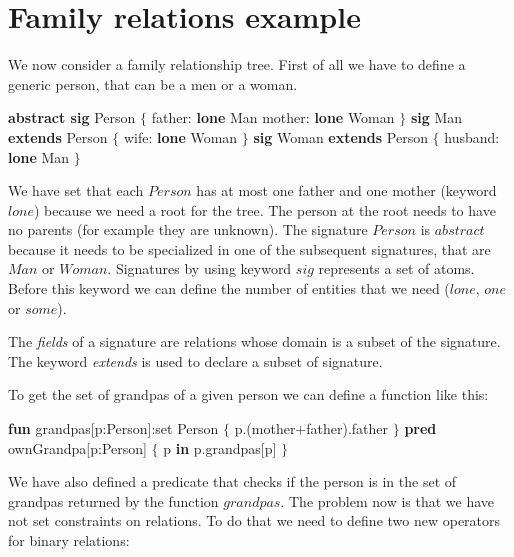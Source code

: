 \documentclass[12pt, a4paper]{report}
\newtheorem[style=M,bodystyle=\normalfont]{theorem}{Theorem}
\newtheorem[style=M,bodystyle=\normalfont]{corollary}{Corollary}
\newtheorem[style=M,bodystyle=\normalfont]{lemma}{Lemma}
\newtheorem[style=M,bodystyle=\normalfont]{definition}{Definition}
\begin{document}
        \section{Family relations example}
        We now consider a family relationship tree. First of all we have to define a generic person, that can be a men or a woman.
        \begin{algorithmic}[H]
            \State \textbf{abstract sig} Person $\{$
            \State \:\:\:\:\:\:\:\: father: \textbf{lone} Man 
            \State \:\:\:\:\:\:\:\: mother: \textbf{lone} Woman
            \State $\}$
            \State \textbf{sig} Man \textbf{extends} Person $\{$
            \State \:\:\:\:\:\:\:\: wife: \textbf{lone} Woman 
            \State $\}$
            \State \textbf{sig} Woman \textbf{extends} Person $\{$
            \State \:\:\:\:\:\:\:\: husband: \textbf{lone} Man 
            \State $\}$
        \end{algorithmic} 
        We have set that each $Person$ has at most one father and one mother (keyword $lone$) because we need a root for the tree. The person at the root needs to have no parents 
        (for example they are unknown). The signature $Person$ is $abstract$ because it needs to be specialized in one of the subsequent signatures, that are $Man$ or $Woman$.
        Signatures by using keyword $sig$ represents a set of atoms. Before this keyword we can define the number of entities that we need ($lone$, $one$ or $some$).
        \begin{definition}
            The \emph{fields} of a signature are relations whose domain is a subset of the signature. The keyword \emph{extends} is used to declare a subset of signature. 
        \end{definition}
        To get the set of grandpas of a given person we can define a function like this: 
        \begin{algorithmic}[H]
            \State \textbf{fun} grandpas[p:Person]:set Person $\{$
            \State \:\:\:\:\:\:\:\: p.(mother+father).father
            \State $\}$
            \State \textbf{pred} ownGrandpa[p:Person] $\{$
            \State \:\:\:\:\:\:\:\: p \textbf{in} p.grandpas[p]
            \State $\}$
        \end{algorithmic} 
        We have also defined a predicate that checks if the person is in the set of grandpas returned by the function $grandpas$. The problem now is that we have not set constraints 
        on relations. To do that we need to define two new operators for binary relations:
\end{document}
